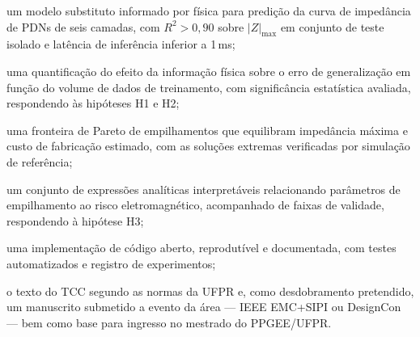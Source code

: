\begin{alineas}
\item um modelo substituto informado por física para predição da curva de
impedância de PDNs de seis camadas, com $R^2 > 0{,}90$ sobre $|Z|_{\max}$ em
conjunto de teste isolado e latência de inferência inferior a 1\,ms;

\item uma quantificação do efeito da informação física sobre o erro de
generalização em função do volume de dados de treinamento, com significância
estatística avaliada, respondendo às hipóteses H1 e H2;

\item uma fronteira de Pareto de empilhamentos que equilibram impedância máxima e
custo de fabricação estimado, com as soluções extremas verificadas por simulação
de referência;

\item um conjunto de expressões analíticas interpretáveis relacionando
parâmetros de empilhamento ao risco eletromagnético, acompanhado de faixas de
validade, respondendo à hipótese H3;

\item uma implementação de código aberto, reprodutível e documentada, com testes
automatizados e registro de experimentos;

\item o texto do TCC segundo as normas da UFPR e, como desdobramento pretendido,
um manuscrito submetido a evento da área — IEEE EMC+SIPI ou DesignCon — bem como
base para ingresso no mestrado do PPGEE/UFPR.
\end{alineas}
